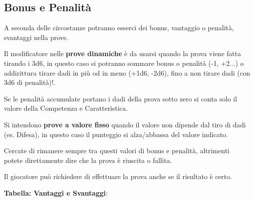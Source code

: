 \begin{multicols}{2}
\subsection{Bonus e Penalità} \label{vantaggi}

A seconda delle circostanze potranno esserci dei bonus, vantaggio o penalità, svantaggi nella prove.

Il modificatore nelle \textbf{prove dinamiche} è da usarsi quando la prova viene fatta tirando i 3d6, in questo caso si potranno sommare bonus o penalità (-1, +2...) o addirittura tirare dadi in più od in meno (+1d6, -2d6), fino a non tirare dadi (con 3d6 di penalità)!.

Se le penalità accumulate portano i dadi della prova sotto zero si conta solo il valore della Competenza e Caratteristica.

Si intendono \textbf{prove a valore fisso}  quando il valore non dipende dal tiro di dadi (es. Difesa), in questo caso il punteggio si alza/abbassa del valore indicato.

Cercate di rimanere sempre tra questi valori di bonus e penalità, altrimenti potete direttamente dire che la prova è riuscita o fallita.

Il giocatore può richiedere di effettuare la prova anche se il risultato è certo.

\smallskip

\textbf{Tabella: Vantaggi e Svantaggi}:

\smallskip



\end{multicols}
